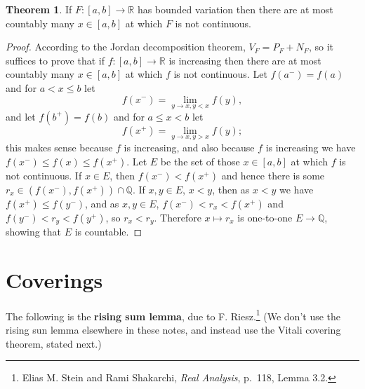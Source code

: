 \documentclass{article}
\theoremstyle{definition}
\newtheorem{theorem}{Theorem}
\theoremstyle{definition}
\begin{document}
\begin{theorem}
If $F:[a,b] \to \mathbb{R}$ has bounded variation then there are at most  countably
many $x \in [a,b]$ at which $F$ is not continuous.
\end{theorem}
\begin{proof}
According to the Jordan decomposition theorem, $V_F = P_F+N_F$, so it suffices to prove that
if $f:[a,b] \to \mathbb{R}$ is increasing then there are at most countably many $x \in [a,b]$ at which
$f$ is not continuous. 
Let $f(a^-)=f(a)$ and for $a<x \leq b$ let
\[
f(x^-) = \lim_{y \to x, y<x}f(y),
\]
and let $f(b^+)=f(b)$ and for $a \leq x < b$ let
\[
f(x^+) = \lim_{y \to x, y>x} f(y);
\]
this makes sense because $f$ is increasing, and also because $f$ is increasing we have
$f(x^-) \leq f(x) \leq f(x^+)$. 
Let $E$ be the set of those $x \in [a,b]$ at which $f$ is not continuous. 
If $x \in E$,  then $f(x^-)<f(x^+)$ and hence
there is some $r_x \in (f(x^-),f(x^+)) \cap \mathbb{Q}$. If $x,y \in E$, $x<y$, then 
as $x<y$ we have $f(x^+) \leq f(y^-)$, and as $x,y \in E$, $f(x^-)<r_x<f(x^+)$ and
$f(y^-)<r_y<f(y^+)$, so  $r_x<r_y$. Therefore $x \mapsto r_x$ is one-to-one $E \to \mathbb{Q}$, showing
that $E$ is countable.
\end{proof}




\section{Coverings}
The following is the \textbf{rising sum lemma}, due to F. Riesz.\footnote{Elias M. Stein and Rami Shakarchi,
{\em Real Analysis}, p.~118, Lemma 3.2.} (We don't use the rising sun lemma elsewhere in these notes, and instead use the
Vitali covering theorem, stated next.)
\end{document}
